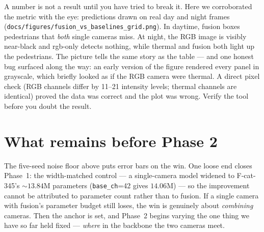 \documentclass[../main.tex]{subfiles}
\begin{document}
\begin{lesson}
A number is not a result until you have tried to break it. Here we corroborated the metric with the
eye: predictions drawn on real day and night frames
(\texttt{docs/figures/fusion\_vs\_baselines\_grid.png}). In daytime, fusion boxes pedestrians that
\emph{both} single cameras miss. At night, the RGB image is visibly near-black and rgb-only detects
nothing, while thermal and fusion both light up the pedestrians. The picture tells the same story as
the table --- and one honest bug surfaced along the way: an early version of the figure rendered
every panel in grayscale, which briefly looked as if the RGB camera were thermal. A direct pixel
check (RGB channels differ by 11--21 intensity levels; thermal channels are identical) proved the
data was correct and the plot was wrong. Verify the tool before you doubt the result.
\end{lesson}

\section{What remains before Phase 2}

The five-seed noise floor above puts error bars on the win. One loose end closes Phase~1: the
width-matched control --- a single-camera model widened to F-cat-345's $\sim13.84$M parameters
(\texttt{base\_ch}=42 gives $14.06$M) --- so the improvement cannot be attributed to parameter
count rather than to fusion. If a single camera with fusion's parameter budget still loses, the win
is genuinely about \emph{combining} cameras. Then the anchor is set, and Phase~2 begins varying the
one thing we have so far held fixed --- \emph{where} in the backbone the two cameras meet.
\end{document}
